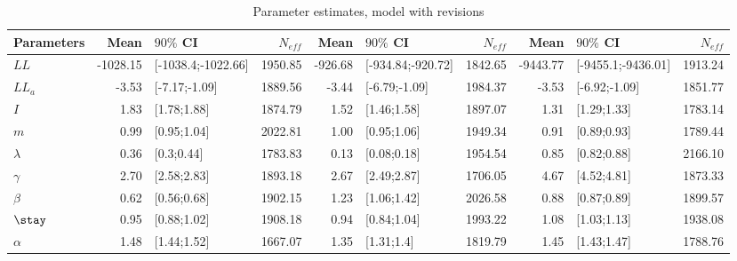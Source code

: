 \begin{table}

\caption{\label{tab:}Parameter estimates, model with revisions}
\centering
\begin{tabular}[t]{lrlrrlrrlr}
\toprule
Parameters & Mean & $90\%$ CI & $N_{eff}$ & Mean & $90\%$ CI & $N_{eff}$ & Mean & $90\%$ CI & $N_{eff}$\\
\midrule
$LL$ & -1028.15 & [-1038.4;-1022.66] & 1950.85 & -926.68 & [-934.84;-920.72] & 1842.65 & -9443.77 & [-9455.1;-9436.01] & 1913.24\\
$LL_a$ & -3.53 & [-7.17;-1.09] & 1889.56 & -3.44 & [-6.79;-1.09] & 1984.37 & -3.53 & [-6.92;-1.09] & 1851.77\\
$I$ & 1.83 & [1.78;1.88] & 1874.79 & 1.52 & [1.46;1.58] & 1897.07 & 1.31 & [1.29;1.33] & 1783.14\\
$m$ & 0.99 & [0.95;1.04] & 2022.81 & 1.00 & [0.95;1.06] & 1949.34 & 0.91 & [0.89;0.93] & 1789.44\\
$\lambda$ & 0.36 & [0.3;0.44] & 1783.83 & 0.13 & [0.08;0.18] & 1954.54 & 0.85 & [0.82;0.88] & 2166.10\\
\addlinespace
$\gamma$ & 2.70 & [2.58;2.83] & 1893.18 & 2.67 & [2.49;2.87] & 1706.05 & 4.67 & [4.52;4.81] & 1873.33\\
$\beta$ & 0.62 & [0.56;0.68] & 1902.15 & 1.23 & [1.06;1.42] & 2026.58 & 0.88 & [0.87;0.89] & 1899.57\\
$\stay$ & 0.95 & [0.88;1.02] & 1908.18 & 0.94 & [0.84;1.04] & 1993.22 & 1.08 & [1.03;1.13] & 1938.08\\
$\alpha$ & 1.48 & [1.44;1.52] & 1667.07 & 1.35 & [1.31;1.4] & 1819.79 & 1.45 & [1.43;1.47] & 1788.76\\
\bottomrule
\end{tabular}
\end{table}
